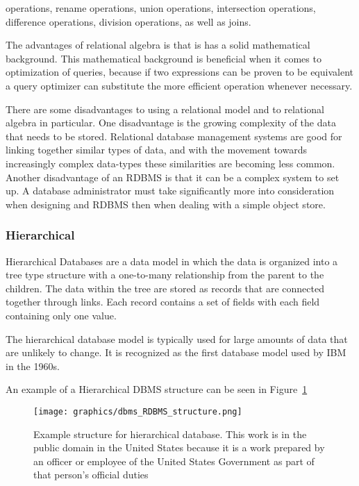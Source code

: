 \documentclass[letterpaper, 12pt]{article}
\begin{document}
operations, rename operations, union operations, intersection operations, difference
operations, division operations, as well as joins.
\par\vspace{\baselineskip}
The advantages of relational algebra is that is has a solid mathematical background.
This mathematical background is beneficial when it comes to optimization of queries,
because if two expressions can be proven to be equivalent a query optimizer can
substitute the more efficient operation whenever necessary.
\par\vspace{\baselineskip}
There are some disadvantages to using a relational model and to relational algebra in
particular. One disadvantage is the growing complexity of the data that needs to be
stored. Relational database management systems are good for linking together similar types
of data, and with the movement towards increasingly complex data-types these similarities
are becoming less common. Another disadvantage of an RDBMS is that it can be a complex
system to set up. A database administrator must take significantly more into consideration
when designing and RDBMS then when dealing with a simple object store.

\subsubsection{Hierarchical}
Hierarchical Databases are a data model in which the data is organized into a tree type
structure with a one-to-many relationship from the parent to the children. The data
within the tree are stored as records that are connected together through links. Each
record contains a set of fields with each field containing only one value.
\par\vspace{\baselineskip}
The hierarchical database model is typically used for large amounts of data that are
unlikely to change. It is recognized as the first database model used by IBM in
the 1960s.\cite{hierarchical_dbms_techopedia}
\par\vspace{\baselineskip}

An example of a Hierarchical DBMS structure can be seen in Figure~\ref{fig:hierarchicalDBMS_structure}
\begin{figure}
  \centering
  \label{fig:hierarchicalDBMS_structure}
  \texttt{[image: graphics/dbms\_RDBMS\_structure.png]}
  \caption{Example structure for hierarchical database. This work is in the public domain in the United States because it is a work prepared by an officer or employee of the United States Government as part of that person’s official duties \cite{wikiHierarchicalDBMS}}
\end{figure}
\end{document}
